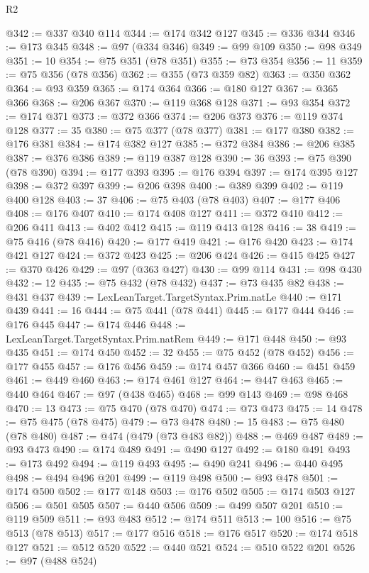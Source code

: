 \begin{lexlean}{R2}
\begin{coremodule}
@342 := @337 @340 @114
@344 := @174 @342 @127
@345 := @336 @344
@346 := @173 @345
@348 := @97 (@334 @346)
@349 := @99 @109
@350 := @98 @349
@351 := 10
@354 := @75 @351 (@78 @351)
@355 := @73 @354
@356 := 11
@359 := @75 @356 (@78 @356)
@362 := @355 (@73 @359 @82)
@363 := @350 @362
@364 := @93 @359
@365 := @174 @364
@366 := @180 @127
@367 := @365 @366
@368 := @206 @367
@370 := @119 @368 @128
@371 := @93 @354
@372 := @174 @371
@373 := @372 @366
@374 := @206 @373
@376 := @119 @374 @128
@377 := 35
@380 := @75 @377 (@78 @377)
@381 := @177 @380
@382 := @176 @381
@384 := @174 @382 @127
@385 := @372 @384
@386 := @206 @385
@387 := @376 @386
@389 := @119 @387 @128
@390 := 36
@393 := @75 @390 (@78 @390)
@394 := @177 @393
@395 := @176 @394
@397 := @174 @395 @127
@398 := @372 @397
@399 := @206 @398
@400 := @389 @399
@402 := @119 @400 @128
@403 := 37
@406 := @75 @403 (@78 @403)
@407 := @177 @406
@408 := @176 @407
@410 := @174 @408 @127
@411 := @372 @410
@412 := @206 @411
@413 := @402 @412
@415 := @119 @413 @128
@416 := 38
@419 := @75 @416 (@78 @416)
@420 := @177 @419
@421 := @176 @420
@423 := @174 @421 @127
@424 := @372 @423
@425 := @206 @424
@426 := @415 @425
@427 := @370 @426
@429 := @97 (@363 @427)
@430 := @99 @114
@431 := @98 @430
@432 := 12
@435 := @75 @432 (@78 @432)
@437 := @73 @435 @82
@438 := @431 @437
@439 := LexLeanTarget.TargetSyntax.Prim.natLe
@440 := @171 @439
@441 := 16
@444 := @75 @441 (@78 @441)
@445 := @177 @444
@446 := @176 @445
@447 := @174 @446
@448 := LexLeanTarget.TargetSyntax.Prim.natRem
@449 := @171 @448
@450 := @93 @435
@451 := @174 @450
@452 := 32
@455 := @75 @452 (@78 @452)
@456 := @177 @455
@457 := @176 @456
@459 := @174 @457 @366
@460 := @451 @459
@461 := @449 @460
@463 := @174 @461 @127
@464 := @447 @463
@465 := @440 @464
@467 := @97 (@438 @465)
@468 := @99 @143
@469 := @98 @468
@470 := 13
@473 := @75 @470 (@78 @470)
@474 := @73 @473
@475 := 14
@478 := @75 @475 (@78 @475)
@479 := @73 @478
@480 := 15
@483 := @75 @480 (@78 @480)
@487 := @474 (@479 (@73 @483 @82))
@488 := @469 @487
@489 := @93 @473
@490 := @174 @489
@491 := @490 @127
@492 := @180 @491
@493 := @173 @492
@494 := @119 @493
@495 := @490 @241
@496 := @440 @495
@498 := @494 @496 @201
@499 := @119 @498
@500 := @93 @478
@501 := @174 @500
@502 := @177 @148
@503 := @176 @502
@505 := @174 @503 @127
@506 := @501 @505
@507 := @440 @506
@509 := @499 @507 @201
@510 := @119 @509
@511 := @93 @483
@512 := @174 @511
@513 := 100
@516 := @75 @513 (@78 @513)
@517 := @177 @516
@518 := @176 @517
@520 := @174 @518 @127
@521 := @512 @520
@522 := @440 @521
@524 := @510 @522 @201
@526 := @97 (@488 @524)

\end{coremodule}
\end{lexlean}
